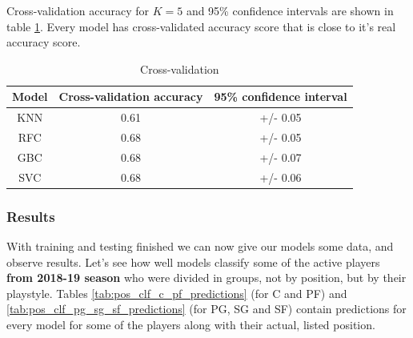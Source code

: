 \documentclass[a4paper]{article}
\begin{document}
Cross-validation accuracy for $K = 5$ and 95\% confidence intervals are shown in table \ref{tab:pos_clf_cross_val_eval}. Every model has cross-validated accuracy score that is close to it's real accuracy score.

\begin{table}[!h]
\begin{center}
\begin{tabular}{|c|c|c|} \hline
Model & Cross-validation accuracy & 95\% confidence interval \\ \hline
KNN & 0.61 & +/- 0.05 \\ \hline
RFC & 0.68 & +/- 0.05 \\ \hline
GBC & 0.68 & +/- 0.07 \\ \hline
SVC & 0.68 & +/- 0.06 \\ \hline
\end{tabular}
\caption{Cross-validation}
\label{tab:pos_clf_cross_val_eval}
\end{center}
\end{table}

\subsubsection{Results}
\label{subsubsec:pos_clf_res}

With training and testing finished we can now give our models some data, and observe results. Let's see how well models classify some of the active players \textbf{from 2018-19 season} who were divided in groups, not by position, but by their playstyle. Tables \ref{tab:pos_clf_c_pf_predictions} (for C and PF) and \ref{tab:pos_clf_pg_sg_sf_predictions} (for PG, SG and SF) contain predictions for every model for some of the players along with their actual, listed position.
\end{document}

